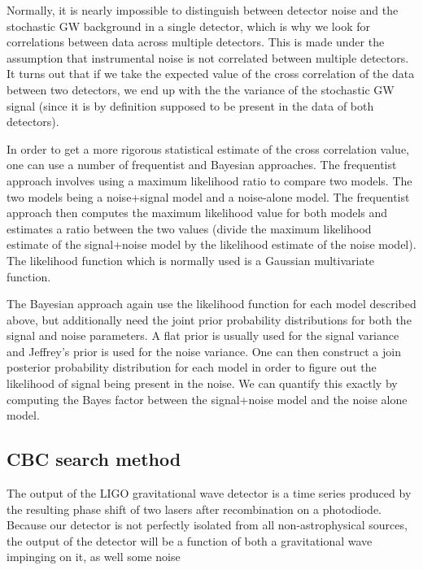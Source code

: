 Normally, it is nearly impossible to distinguish between detector noise and the stochastic \ac{GW} background in a single detector, which is why we look for correlations between data across multiple detectors. This is made under the assumption that instrumental noise is not correlated between multiple detectors. It turns out that if we take the expected value of the cross correlation of the data between two detectors, we end up with the the variance of the stochastic \ac{GW} signal (since it is by definition supposed to be present in the data of both detectors).

%
%
In order to get a more rigorous statistical estimate of the cross correlation value, one can use a number of frequentist and Bayesian approaches. The frequentist approach involves using a maximum likelihood ratio to compare two models. The two models being a noise+signal model and a noise-alone model. The frequentist approach then computes the maximum likelihood value for both models and estimates a ratio between the two values (divide the maximum likelihood estimate of the signal+noise model by the likelihood estimate of the noise model). The likelihood function which is normally used is a Gaussian multivariate function.

The Bayesian approach again use the likelihood function for each model described above, but additionally need the joint prior probability distributions for both the signal and noise parameters. A flat prior is usually used for the signal variance and Jeffrey’s prior is used for the noise variance. One can then construct a join posterior probability distribution for each model in order to figure out the likelihood of signal being present in the noise. We can quantify this exactly by computing the Bayes factor between the signal+noise model and the noise alone model.


%
%



\subsection{\ac{CBC} search method}

The output of the \ac{LIGO} gravitational wave detector is a time series produced by the resulting phase shift of two lasers after recombination on a photodiode. Because our detector is not perfectly isolated from all non-astrophysical sources, the output of the detector will be a function of both a gravitational wave impinging on it, as well some noise

